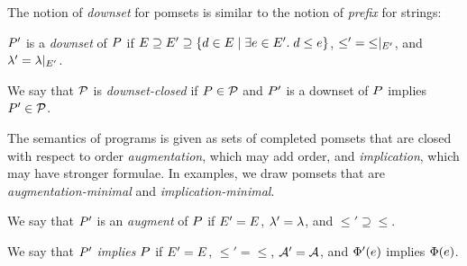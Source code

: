 The notion of \emph{downset} for pomsets is similar to the notion of
\emph{prefix} for strings:
\begin{definition}
  \label{def:downset}
  $P'$ is a \emph{downset} of $P$ if
  $E \supseteq E' \supseteq \{ d \in E \mid
  \exists e\in E'.\; d\le e\}$, ${\le'}={\le}\mathbin{|}_{E'}$,
  and ${\lambda'}={\lambda}\mathbin{|}_{E'}$.
\end{definition}
We say that $\mathcal{P}$ is \emph{downset-closed} if $P\in\mathcal{P}$ and $P'$ is
a downset of $P$ implies $P'\in\mathcal{P}$.



The semantics of programs is given as sets of completed pomsets that are
closed with respect to order \emph{augmentation}, which may add order, and
\emph{implication}, which may have stronger formulae.  In examples, we draw
pomsets that are \emph{augmentation\hyp{}minimal} and
\emph{implication\hyp{}minimal}.
\begin{definition}
  We say that
  $P'$ is an \emph{augment} of $P$ if $E'=E$,
  ${\lambda'}={\lambda}$, and ${\le'}\supseteq{\le}$. 
  
  We say that
  $P'$ \emph{implies} $P$ if $E'=E$, ${\le'}={\le}$,
  $\mathcal{A}'=\mathcal{A}$, and $\Phi'(e)$
  implies $\Phi(e)$. 
\end{definition}
 

